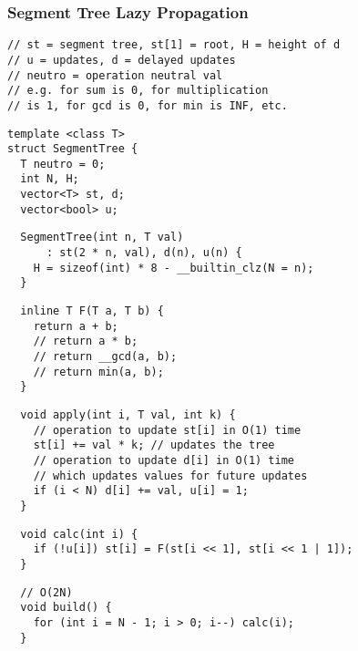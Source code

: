 \documentclass[twoside]{article}
\begin{document}
\begin{multicols*}{2}
\subsubsectionfont{\large\bfseries\sffamily\underline}
\subsubsection*{Segment Tree Lazy Propagation}
\begin{verbatim}
// st = segment tree, st[1] = root, H = height of d
// u = updates, d = delayed updates
// neutro = operation neutral val
// e.g. for sum is 0, for multiplication
// is 1, for gcd is 0, for min is INF, etc.
\end{verbatim}
\vspace{-12pt}
\begin{verbatim}
template <class T>
struct SegmentTree {
  T neutro = 0;
  int N, H;
  vector<T> st, d;
  vector<bool> u;
\end{verbatim}
\vspace{-12pt}
\begin{verbatim}
  SegmentTree(int n, T val)
      : st(2 * n, val), d(n), u(n) {
    H = sizeof(int) * 8 - __builtin_clz(N = n);
  }
\end{verbatim}
\vspace{-12pt}
\begin{verbatim}
  inline T F(T a, T b) {
    return a + b;
    // return a * b;
    // return __gcd(a, b);
    // return min(a, b);
  }
\end{verbatim}
\vspace{-12pt}
\begin{verbatim}
  void apply(int i, T val, int k) {
    // operation to update st[i] in O(1) time
    st[i] += val * k; // updates the tree
    // operation to update d[i] in O(1) time
    // which updates values for future updates
    if (i < N) d[i] += val, u[i] = 1;
  }
\end{verbatim}
\vspace{-12pt}
\begin{verbatim}
  void calc(int i) {
    if (!u[i]) st[i] = F(st[i << 1], st[i << 1 | 1]);
  }
\end{verbatim}
\vspace{-12pt}
\begin{verbatim}
  // O(2N)
  void build() {
    for (int i = N - 1; i > 0; i--) calc(i);
  }
\end{verbatim}

\end{multicols*}
\end{document}
